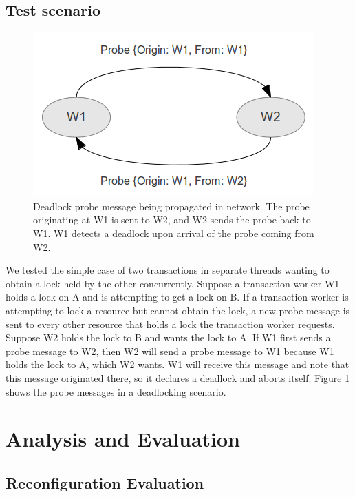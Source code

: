 \documentclass[a4paper, 10pt, notitlepage]{article}
\begin{document}
\subsection{Test scenario}
\begin{figure}[h!]

  \centering
    \includegraphics[scale=0.9]{deadlock-message.png}
  \caption{Deadlock probe message being propagated in network. The probe originating at W1 is sent to W2, and W2 sends the probe back to W1. W1 detects a deadlock upon arrival of the probe coming from W2.}
\end{figure}

We tested the simple case of two transactions in separate threads wanting to obtain a lock held by the other concurrently. Suppose a transaction worker W1 holds a lock on A and is attempting to get a lock on B. If a transaction worker is attempting to lock a resource but cannot obtain the lock, a new probe message is sent to every other resource that holds a lock the transaction worker requests. Suppose W2 holds the lock to B and wants the lock to A. If W1 first sends a probe message to W2, then W2 will send a probe message to W1 because W1 holds the lock to A, which W2 wants. W1 will receive this message and note that this message originated there, so it declares a deadlock and aborts itself. Figure 1 shows the probe messages in a deadlocking scenario.


\section{Analysis and Evaluation}

\subsection{Reconfiguration Evaluation}
\end{document}
